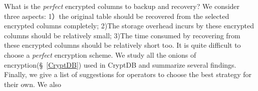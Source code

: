 What is the \textit{perfect} encrypted columns to backup and recovery? We consider three aspects: 1）the original table should be recovered from the selected encrypted columns completely; 2)The storage overhead incurs by these encrypted columns should be relatively small; 3)The time consumed by recovering from these encrypted columns should be relatively short too. It is quite difficult to choose a \textit{perfect} encryption scheme. We study all the onions of encryption(\S~\ref{CryptDB}) used in CryptDB and summarize several findings. Finally, we give a list of suggestions for operators to choose the best strategy for their own. We also 















